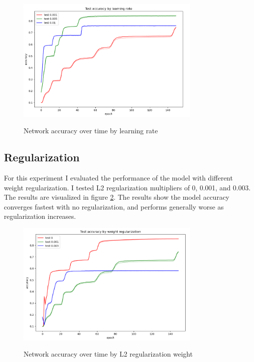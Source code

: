 \documentclass{article}
\begin{document}
\begin{figure}[H]
    \centering
    \includegraphics[width=0.8\textwidth]{part2/experiments/lr/lr_000.png}
    \label{fig:lr}
    \caption{Network accuracy over time by learning rate}
\end{figure}

\subsection{Regularization}
For this experiment I evaluated the performance of the model with different weight regularization. I tested L2 regularization multipliers of 0, 0.001, and 0.003. The results are visualized in figure \ref{fig:reg}. The results show the model accuracy converges fastest with no regularization, and performs generally worse as regularization increases.

\begin{figure}[H]
    \centering
    \includegraphics[width=0.8\textwidth]{part2/experiments/regularization/regularization.png}
    \label{fig:reg}
    \caption{Network accuracy over time by L2 regularization weight}
\end{figure}
\end{document}
